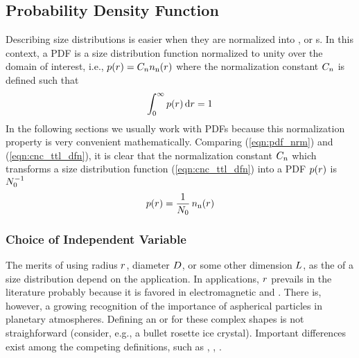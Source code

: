 \documentclass[12pt,twoside]{article}
\newcommand{\pdfrds}{\pdffnc(\rds)}
\begin{document}
\subsection[Probability Density Function]{Probability Density Function}
Describing size distributions is easier when they are
normalized into , or s.
In this context, a PDF is a size distribution function normalized to
unity over the domain of interest, i.e.,  $\pdfrds = \cstnrm \dstnbrofrds$
where the normalization constant $C_{n}$ is defined such that
\begin{equation}
\int_{0}^{\infty} \pdfrds \,\dfr\rds = 1
\label{eqn:pdf_nrm}
\end{equation}
In the following sections we usually work with PDFs because this
normalization property is very convenient mathematically.
Comparing (\ref{eqn:pdf_nrm}) and (\ref{eqn:cnc_ttl_dfn}), it is clear
that the normalization constant $C_{n}$ which transforms a size
distribution  function (\ref{eqn:cnc_ttl_dfn}) into a PDF $\pdfrds$ is
$N_{0}^{-1}$  
\begin{equation}
\pdfrds = \frac{1}{\cncttl} \, \dstnbrofrds
\label{eqn:pdf_dfn}
\end{equation}

\subsubsection[Independent Variable]{Choice of Independent Variable}
The merits of using radius $r$, diameter $D$, or some other
dimension $L$, as the  of a size
distribution depend on the application. 
In  applications, $r$ prevails in the
literature probably because it is favored in electromagnetic and 
. 
There is, however, a growing recognition of the importance of
aspherical particles in planetary atmospheres. 
Defining an  or 
for these complex shapes is not straighforward (consider, e.g., a
bullet rosette ice crystal).
Important differences exist among the competing definitions, such as
, , \cite[e.g.,][]{EbC92,McH972}. 
\end{document}
